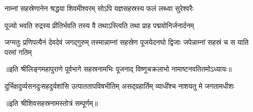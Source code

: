 \twolineshloka
{नाम्नां सहस्रेणानेन श्रद्धया शिवमीश्वरम्}
{सोऽपि यज्ञसहस्रस्य फलं लब्ध्वा सुरेश्वरैः}%

\twolineshloka
{पूज्यो भवति रुद्रस्य प्रीतिर्भवति तस्य वै}
{तथाऽस्त्विति तथा प्राह पद्मयोनिर्जनार्दनम्}%

\threelineshloka
{जग्मतुः प्रणिपत्यैनं देवदेवं जगद्गुरुम्} 
{तस्मान्नाम्नां सहस्रेण पूजयेदनघो द्विजाः}
{जपेन्नाम्नां सहस्रं च स याति परमां गतिम्}%

{॥इति श्रीलिङ्गमहापुराणे पूर्वभागे सहस्रनामभिः पूजनाद् विष्णुचक्रलाभो नामाष्टनवतितमोऽध्यायः॥}%

{दुर्भिक्षदुर्व्यसनदुःसहदुर्यशांसि}
{उत्पाततापविषभीतिम् असद्‌ग्रहार्तिम्}
{व्याधींश्च नाशयतु मे जगतामधीशः}

॥इति श्रीशिवसहस्रनामस्तोत्रं सम्पूर्णम्॥

\hyperref[sec:start_ShivaSahasranamaStotram-VishnuKrtam]{\closesection}